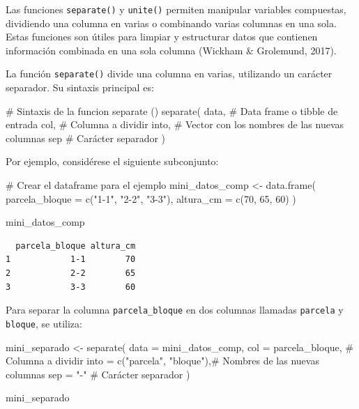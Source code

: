 \documentclass[
  spanish,
  a4paper,
  DIV=11,
  numbers=noendperiod,
  onepage,
  openany]{scrreprt}
\newenvironment{Shaded}{\begin{snugshade}}{\end{snugshade}}
\newcommand{\AttributeTok}[1]{\textcolor[rgb]{0.40,0.45,0.13}{#1}}
\newcommand{\CommentTok}[1]{\textcolor[rgb]{0.37,0.37,0.37}{#1}}
\newcommand{\DecValTok}[1]{\textcolor[rgb]{0.68,0.00,0.00}{#1}}
\newcommand{\FunctionTok}[1]{\textcolor[rgb]{0.28,0.35,0.67}{#1}}
\newcommand{\NormalTok}[1]{\textcolor[rgb]{0.00,0.23,0.31}{#1}}
\newcommand{\OtherTok}[1]{\textcolor[rgb]{0.00,0.23,0.31}{#1}}
\newcommand{\StringTok}[1]{\textcolor[rgb]{0.13,0.47,0.30}{#1}}
\begin{document}
Las funciones \texttt{separate()} y \texttt{unite()} permiten manipular
variables compuestas, dividiendo una columna en varias o combinando
varias columnas en una sola. Estas funciones son útiles para limpiar y
estructurar datos que contienen información combinada en una sola
columna (Wickham \& Grolemund, 2017).

La función \texttt{separate()} divide una columna en varias, utilizando
un carácter separador. Su sintaxis principal es:

\begin{Shaded}
\begin{Highlighting}[]
\CommentTok{\# Sintaxis de la funcion separate ()}
\FunctionTok{separate}\NormalTok{(}
\NormalTok{  data,    }\CommentTok{\# Data frame o tibble de entrada}
\NormalTok{  col,     }\CommentTok{\# Columna a dividir}
\NormalTok{  into,    }\CommentTok{\# Vector con los nombres de las nuevas columnas}
\NormalTok{  sep      }\CommentTok{\# Carácter separador }
\NormalTok{)}
\end{Highlighting}
\end{Shaded}

Por ejemplo, considérese el siguiente subconjunto:

\begin{Shaded}
\begin{Highlighting}[]
\CommentTok{\# Crear el dataframe para el ejemplo}
\NormalTok{mini\_datos\_comp }\OtherTok{\textless{}{-}} \FunctionTok{data.frame}\NormalTok{(}
  \AttributeTok{parcela\_bloque =} \FunctionTok{c}\NormalTok{(}\StringTok{"1{-}1"}\NormalTok{, }\StringTok{"2{-}2"}\NormalTok{, }\StringTok{"3{-}3"}\NormalTok{),}
  \AttributeTok{altura\_cm =} \FunctionTok{c}\NormalTok{(}\DecValTok{70}\NormalTok{, }\DecValTok{65}\NormalTok{, }\DecValTok{60}\NormalTok{)}
\NormalTok{)}

\NormalTok{mini\_datos\_comp}
\end{Highlighting}
\end{Shaded}

\begin{verbatim}
  parcela_bloque altura_cm
1            1-1        70
2            2-2        65
3            3-3        60
\end{verbatim}

Para separar la columna \texttt{parcela\_bloque} en dos columnas
llamadas \texttt{parcela} y \texttt{bloque}, se utiliza:

\begin{Shaded}
\begin{Highlighting}[]
\NormalTok{mini\_separado }\OtherTok{\textless{}{-}} \FunctionTok{separate}\NormalTok{(}
  \AttributeTok{data =}\NormalTok{ mini\_datos\_comp,}
  \AttributeTok{col =}\NormalTok{ parcela\_bloque,    }\CommentTok{\# Columna a dividir}
  \AttributeTok{into =} \FunctionTok{c}\NormalTok{(}\StringTok{"parcela"}\NormalTok{, }\StringTok{"bloque"}\NormalTok{),}\CommentTok{\# Nombres de las nuevas columnas}
  \AttributeTok{sep =} \StringTok{"{-}"}                \CommentTok{\# Carácter separador}
\NormalTok{)}

\NormalTok{mini\_separado}
\end{Highlighting}
\end{Shaded}
\end{document}
